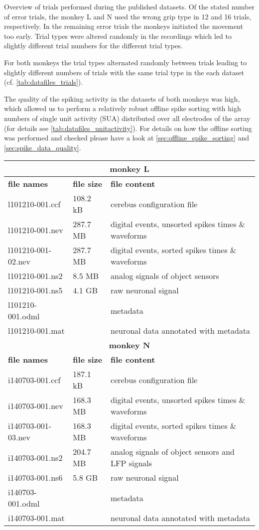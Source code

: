 {Overview of trials performed during the published datasets. Of the stated number of error trials, the monkey L and N used the wrong grip type in 12 and 16 trials, respectively. In the remaining error trials the monkeys initiated the movement too early. Trial types were altered randomly in the recordings which led to slightly different trial numbers for the different trial types.

For both monkeys the trial types alternated randomly between trials leading to slightly different numbers of trials with the same trial type in the each dataset (cf. \cref{tab:datafiles_trials}). 



The quality of the spiking activity in the datasets of both monkeys was high, which allowed us to perform a relatively robust offline spike sorting with high numbers of single unit activity (SUA) distributed over all electrodes of the array (for details see \ref{tab:datafiles_unitactivity}). For details on how the offline sorting was performed and checked please have a look at \cref{sec:offline_spike_sorting} and \cref{sec:spike_data_quality}. 

\begin{table}
\begin{tabular}{|l|l|l|}
\hline 
\multicolumn{3}{|c|}{\textbf{monkey L}}\tabularnewline
\hline 
\textbf{file names} & \textbf{file size} & \textbf{file content}\tabularnewline
\hline 
\hline 
l101210-001.ccf & 108.2 kB & cerebus configuration file\tabularnewline
\hline 
l101210-001.nev & 287.7 MB & digital events, unsorted spikes times \& waveforms\tabularnewline
\hline 
l101210-001-02.nev & 287.7 MB & digital events, sorted spikes times \& waveforms\tabularnewline
\hline 
l101210-001.ns2 & 8.5 MB & analog signals of object sensors\tabularnewline
\hline 
l101210-001.ns5 & 4.1 GB & raw neuronal signal\tabularnewline
\hline 
l101210-001.odml &  & metadata\tabularnewline
\hline 
l101210-001.mat &  & neuronal data annotated with metadata\tabularnewline
\hline 
\hline 
\multicolumn{3}{|c|}{\textbf{monkey N}}\tabularnewline
\hline 
\textbf{file names} & \textbf{file size} & \textbf{file content}\tabularnewline
\hline 
\hline 
i140703-001.ccf & 187.1 kB & cerebus configuration file\tabularnewline
\hline 
i140703-001.nev & 168.3 MB & digital events, unsorted spikes times \& waveforms\tabularnewline
\hline 
i140703-001-03.nev & 168.3 MB & digital events, sorted spikes times \& waveforms\tabularnewline
\hline 
i140703-001.ns2 & 204.7 MB & analog signals of object sensors and LFP signals\tabularnewline
\hline 
i140703-001.ns6 & 5.8 GB & raw neuronal signal\tabularnewline
\hline 
i140703-001.odml &  & metadata\tabularnewline
\hline 
i140703-001.mat &  & neuronal data annotated with metadata\tabularnewline
\hline 
\end{tabular}


\end{table}}
